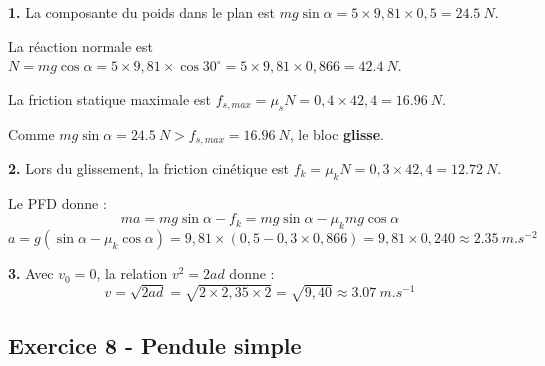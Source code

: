 \documentclass[12pt,a4paper]{article}
\begin{document}
\begin{boitecorrige}
\textbf{1.} La composante du poids dans le plan est $mg\sin\alpha = 5\times9{,}81\times0{,}5 = \qty{24.5}{N}$.

La réaction normale est $N = mg\cos\alpha = 5\times9{,}81\times\cos30^\circ = 5\times9{,}81\times0{,}866 = \qty{42.4}{N}$.

La friction statique maximale est $f_{s,max} = \mu_s N = 0{,}4\times42{,}4 = \qty{16.96}{N}$.

Comme $mg\sin\alpha = \qty{24.5}{N} > f_{s,max} = \qty{16.96}{N}$, le bloc \textbf{glisse}.

\textbf{2.} Lors du glissement, la friction cinétique est $f_k = \mu_k N = 0{,}3\times42{,}4 = \qty{12.72}{N}$.

Le PFD donne :
\[
ma = mg\sin\alpha - f_k = mg\sin\alpha - \mu_k mg\cos\alpha
\]
\[
a = g(\sin\alpha - \mu_k\cos\alpha) = 9{,}81\times(0{,}5 - 0{,}3\times0{,}866)
= 9{,}81\times 0{,}240 \approx \qty{2.35}{m.s^{-2}}
\]

\textbf{3.} Avec $v_0 = 0$, la relation $v^2 = 2ad$ donne :
\[
v = \sqrt{2ad} = \sqrt{2\times2{,}35\times2} = \sqrt{9{,}40} \approx \qty{3.07}{m.s^{-1}}
\]
\end{boitecorrige}

\subsection*{Exercice 8 - Pendule simple \niveau{\facile}}
\end{document}
